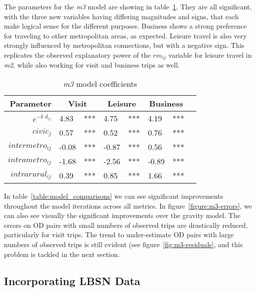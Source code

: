 The parameters for the \textit{m3} model are showing in table~\ref{table:m3-coeff}. They are all significant, with the three new variables having differing magnitudes and signs, that each make logical sense for the different purposes. Business shows a strong preference for traveling to other metropolitan areas, as expected. Leisure travel is also very strongly influenced by metropolitan connections, but with a negative sign. This replicates the observed explanatory power of the $rm_{ij}$ variable for leisure travel in \textit{m2}, while also working for visit and business trips as well.


\begin{table}[H]
\centering
\caption{\textit{m3} model coefficients}
\label{table:m3-coeff}
\begin{tabular}{@{}rlrlrlrl@{}}
  \toprule
 Parameter & \multicolumn{2}{c}{Visit} & \multicolumn{2}{c}{Leisure} & \multicolumn{2}{c}{Business} &  \\ \midrule
  $e^{-k\ d_{ij}}$ 	& 4.83 & *** & 4.75 & *** & 4.19 & *** \\  
  $civic_j$ & 0.57 & *** & 0.52 & *** & 0.76 & *** \\ 
  $intermetro_{ij}$ & -0.08 & *** & -0.87 & *** & 0.56 & *** \\ 
  $intrametro_{ij}$ & -1.68 & *** & -2.56 & *** & -0.89 & *** \\  
  $intrarural_{ij}$ & 0.39 & *** & 0.85 & *** & 1.66 & *** \\ 
   \bottomrule
\end{tabular}
\end{table}

In table~\ref{table:model_comparisons} we can see significant improvements throughout the model iterations across all metrics. In figure~\ref{figure:m3-errors}, we can also see visually the significant improvements over the gravity model. The errors on OD pairs with small numbers of observed trips are drastically reduced, particularly for visit trips. The trend to under-estimate OD pairs with large numbers of observed trips is still evident (see figure~\ref{fig:m3-residuals}, and this problem is tackled in the next section. 


\subsection{Incorporating LBSN Data}

